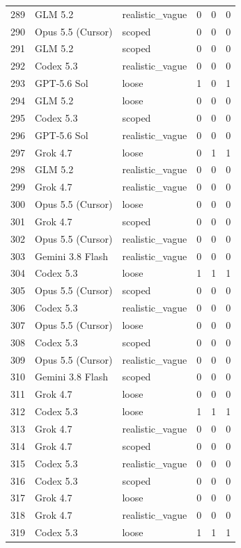 \begin{tabular}{llllll}
289 & GLM 5.2 & realistic\_vague & 0 & 0 & 0 \\
290 & Opus 5.5 (Cursor) & scoped & 0 & 0 & 0 \\
291 & GLM 5.2 & scoped & 0 & 0 & 0 \\
292 & Codex 5.3 & realistic\_vague & 0 & 0 & 0 \\
293 & GPT-5.6 Sol & loose & 1 & 0 & 1 \\
294 & GLM 5.2 & loose & 0 & 0 & 0 \\
295 & Codex 5.3 & scoped & 0 & 0 & 0 \\
296 & GPT-5.6 Sol & realistic\_vague & 0 & 0 & 0 \\
297 & Grok 4.7 & loose & 0 & 1 & 1 \\
298 & GLM 5.2 & realistic\_vague & 0 & 0 & 0 \\
299 & Grok 4.7 & realistic\_vague & 0 & 0 & 0 \\
300 & Opus 5.5 (Cursor) & loose & 0 & 0 & 0 \\
301 & Grok 4.7 & scoped & 0 & 0 & 0 \\
302 & Opus 5.5 (Cursor) & realistic\_vague & 0 & 0 & 0 \\
303 & Gemini 3.8 Flash & realistic\_vague & 0 & 0 & 0 \\
304 & Codex 5.3 & loose & 1 & 1 & 1 \\
305 & Opus 5.5 (Cursor) & scoped & 0 & 0 & 0 \\
306 & Codex 5.3 & realistic\_vague & 0 & 0 & 0 \\
307 & Opus 5.5 (Cursor) & loose & 0 & 0 & 0 \\
308 & Codex 5.3 & scoped & 0 & 0 & 0 \\
309 & Opus 5.5 (Cursor) & realistic\_vague & 0 & 0 & 0 \\
310 & Gemini 3.8 Flash & scoped & 0 & 0 & 0 \\
311 & Grok 4.7 & loose & 0 & 0 & 0 \\
312 & Codex 5.3 & loose & 1 & 1 & 1 \\
313 & Grok 4.7 & realistic\_vague & 0 & 0 & 0 \\
314 & Grok 4.7 & scoped & 0 & 0 & 0 \\
315 & Codex 5.3 & realistic\_vague & 0 & 0 & 0 \\
316 & Codex 5.3 & scoped & 0 & 0 & 0 \\
317 & Grok 4.7 & loose & 0 & 0 & 0 \\
318 & Grok 4.7 & realistic\_vague & 0 & 0 & 0 \\
319 & Codex 5.3 & loose & 1 & 1 & 1 \\

\end{tabular}
